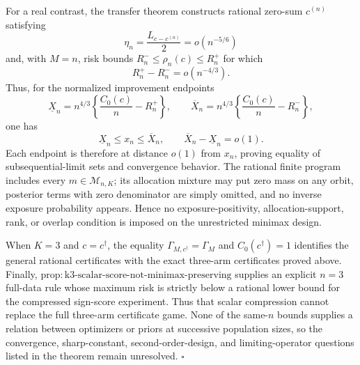 For a real contrast, the transfer theorem constructs rational zero-sum \(c^{(n)}\) satisfying
\[
 \eta_n=\frac{L_{c-c^{(n)}}}{2}=o(n^{-5/6})
\]
and, with \(M=n\), risk bounds \(R_n^-\leq\rho_n(c)\leq R_n^+\) for which
\[
 R_n^+-R_n^-=o(n^{-4/3}).
\]
Thus, for the normalized improvement endpoints
\[
 \underline X_n=n^{4/3}\left\{\frac{C_0(c)}n-R_n^+\right\},
 \qquad
 \overline X_n=n^{4/3}\left\{\frac{C_0(c)}n-R_n^-\right\},
\]
one has
\[
 \underline X_n\leq x_n\leq\overline X_n,
 \qquad
 \overline X_n-\underline X_n=o(1).
\]
Each endpoint is therefore at distance \(o(1)\) from \(x_n\), proving equality of subsequential-limit sets and convergence behavior.  The rational finite program includes every \(m\in\mathcal M_{n,K}\); its allocation mixture may put zero mass on any orbit, posterior terms with zero denominator are simply omitted, and no inverse exposure probability appears.  Hence no exposure-positivity, allocation-support, rank, or overlap condition is imposed on the unrestricted minimax design.

When \(K=3\) and \(c=c^\dagger\), the equality \(\Gamma_{M,c^\dagger}=\Gamma_M\) and \(C_0(c^\dagger)=1\) identifies the general rational certificates with the exact three-arm certificates proved above.  Finally, \(\mathrm{prop:k3\text{-}scalar\text{-}score\text{-}not\text{-}minimax\text{-}preserving}\) supplies an explicit \(n=3\) full-data rule whose maximum risk is strictly below a rational lower bound for the compressed sign-score experiment.  Thus that scalar compression cannot replace the full three-arm certificate game.  None of the same-\(n\) bounds supplies a relation between optimizers or priors at successive population sizes, so the convergence, sharp-constant, second-order-design, and limiting-operator questions listed in the theorem remain unresolved. \(\square\)